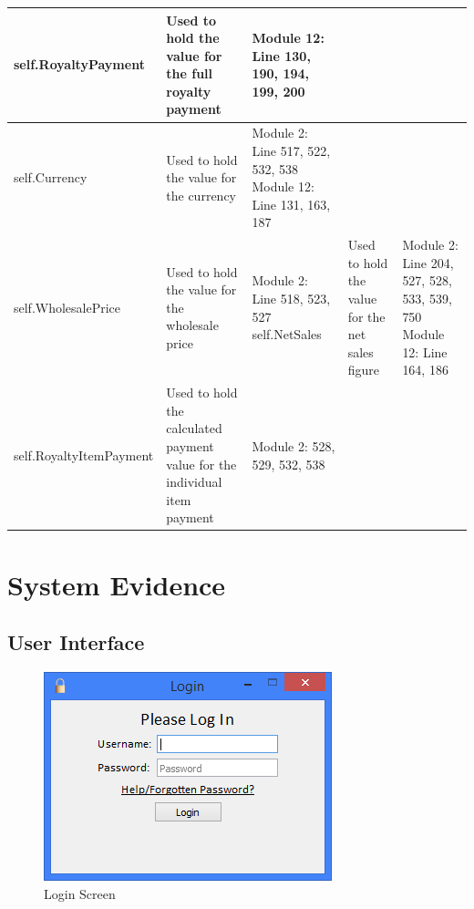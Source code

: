 \begin{center}
\begin{tabular}{|p{3cm}|p{4cm}|p{3cm}|}
    self.RoyaltyPayment & Used to hold the value for the full royalty payment & Module 12: Line 130, 190, 194, 199, 200 \\ \hline
    \hline
    self.Currency & Used to hold the value for the currency & Module 2: Line 517, 522, 532, 538 \newline Module 12: Line 131, 163, 187 \\ \hline
    self.WholesalePrice & Used to hold the value for the wholesale price & Module 2: Line 518, 523, 527 \newline 
    self.NetSales & Used to hold the value for the net sales figure & Module 2: Line 204, 527, 528, 533, 539, 750 \newline Module 12: Line 164, 186 \\ \hline
    self.RoyaltyItemPayment & Used to hold the calculated payment value for the individual item payment & Module 2: 528, 529, 532, 538 \\ \hline
     
\end{tabular}
\end{center}

\section{System Evidence}

\subsection{User Interface}

\begin{figure}[H]
    \caption{Login Screen} \label{fig:LoginScreen}
    \includegraphics[width=\textwidth]{./Maintenance/UserInterface/LoginScreen.png}
\end{figure}

